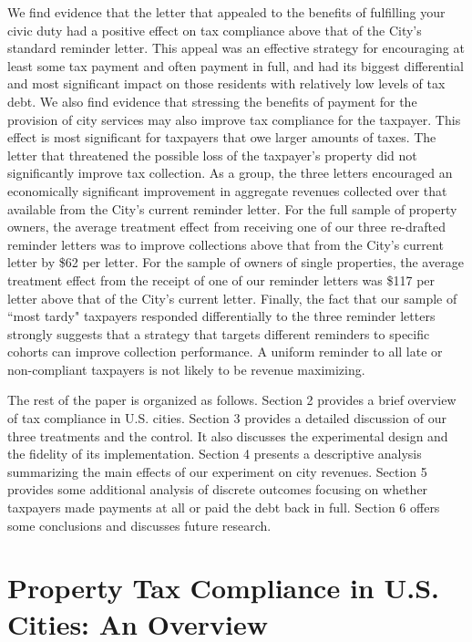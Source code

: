 \documentclass[12pt,titlepage]{article}
\begin{document}
We find evidence that the letter that appealed to the benefits of
fulfilling your civic duty had a positive effect on tax compliance
above that of the City's standard reminder letter.  This appeal was an
effective strategy for encouraging at least some tax payment and often
payment in full, and had its biggest differential and most significant
impact on those residents with relatively low levels of tax debt.  We
also find evidence that stressing the benefits of payment for the
provision of city services may also improve tax compliance for the
taxpayer.  This effect is most significant for taxpayers that owe
larger amounts of taxes. The letter that threatened the possible loss
of the taxpayer's property did not significantly improve tax
collection.  As a group, the three letters encouraged an economically
significant improvement in aggregate revenues
collected over that available from the City's current reminder letter.
For the full sample of property owners, the average treatment effect
from receiving one of our three re-drafted reminder letters was to
improve collections above that from the City's current letter by
\$62 per letter.  For the sample of owners of single properties, the
average treatment effect from the receipt of one of our reminder
letters was \$117 per letter above that of the City's current letter.
Finally, the fact that our sample of ``most tardy" taxpayers responded
differentially to the three reminder letters strongly suggests that a
strategy that targets different reminders to specific cohorts can
improve collection performance.  A uniform reminder to all late or
non-compliant taxpayers is not likely to be revenue maximizing.

The rest of the paper is organized as follows.  Section 2 provides a
brief overview of tax compliance in U.S. cities. Section 3 provides
a detailed discussion of our three treatments and the control. It also
discusses the experimental design and the fidelity of its
implementation. Section 4 presents a descriptive analysis summarizing
the main effects of our experiment on city revenues.  Section 5 provides 
some additional analysis of discrete outcomes focusing on whether 
taxpayers made payments at all or paid the debt back in full.
Section 6 offers some conclusions and discusses future research.


\section{Property Tax Compliance in U.S. Cities: An Overview}
\end{document}
